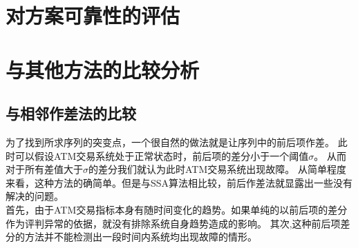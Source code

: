 \documentclass[a4paper]{article}
\begin{document}
\section{对方案可靠性的评估}
\section{与其他方法的比较分析}
\subsection{与相邻作差法的比较}
\indent 为了找到所求序列的突变点，一个很自然的做法就是让序列中的前后项作差。
此时可以假设ATM交易系统处于正常状态时，前后项的差分小于一个阈值$\sigma$。
从而对于所有差值大于$\sigma$的差分我们就认为此时ATM交易系统出现故障。
从简单程度来看，这种方法的确简单。但是与SSA算法相比较，前后作差法就显露出一些没有解决的问题。\\
\indent 首先，由于ATM交易指标本身有随时间变化的趋势。如果单纯的以前后项的差分作为评判异常的依据，就没有排除系统自身趋势造成的影响。
\indent 其次,这种前后项差分的方法并不能检测出一段时间内系统均出现故障的情形。
\end{document}
